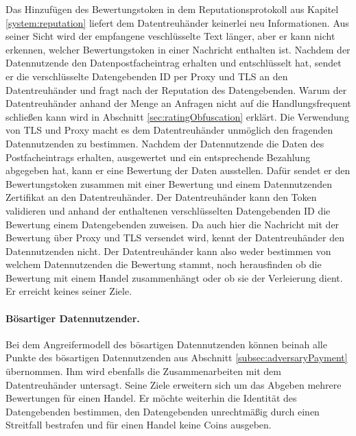 \documentclass[
	fontsize=12pt,
	headings=small,
	parskip=half,           %
	bibliography=totoc,
	numbers=noenddot,       %
	open=any,               %
]{scrreprt}
\begin{document}
Das Hinzufügen des Bewertungstoken in dem Reputationsprotokoll aus Kapitel \ref{system:reputation} liefert dem Datentreuhänder keinerlei neu Informationen. Aus seiner Sicht wird der empfangene veschlüsselte Text länger, aber er kann nicht erkennen, welcher Bewertungstoken in einer Nachricht enthalten ist. Nachdem der Datennutzende den Datenpostfacheintrag erhalten und entschlüsselt hat, sendet er die verschlüsselte Datengebenden ID per Proxy und TLS an den Datentreuhänder und fragt nach der Reputation des Datengebenden. Warum der Datentreuhänder anhand der Menge an Anfragen nicht auf die Handlungsfrequent schließen kann wird in Abschnitt \ref{sec:ratingObfuscation} erklärt. Die Verwendung von TLS und Proxy macht es dem Datentreuhänder unmöglich den fragenden Datennutzenden zu bestimmen. Nachdem der Datennutzende die Daten des Postfacheintrags erhalten, ausgewertet und ein entsprechende Bezahlung abgegeben hat, kann er eine Bewertung der Daten ausstellen. Dafür sendet er den Bewertungstoken zusammen mit einer Bewertung und einem Datennutzenden Zertifikat an den Datentreuhänder. Der Datentreuhänder kann den Token validieren und anhand der enthaltenen verschlüsselten Datengebenden ID die Bewertung einem Datengebenden zuweisen. Da auch hier die Nachricht mit der Bewertung über Proxy und TLS versendet wird, kennt der Datentreuhänder den Datennutzenden nicht. Der Datentreuhänder kann also weder bestimmen von welchem Datennutzenden die Bewertung stammt, noch herausfinden ob die Bewertung mit einem Handel zusammenhängt oder ob sie der Verleierung dient. Er erreicht keines seiner Ziele. 

\paragraph{Bösartiger Datennutzender.}
Bei dem Angreifermodell des bösartigen Datennutzenden können beinah alle Punkte des bösartigen Datennutzenden aus Abschnitt \ref{subsec:adversaryPayment} übernommen.
Ihm wird ebenfalls die Zusammenarbeiten mit dem Datentreuhänder untersagt. Seine Ziele erweitern sich um das Abgeben mehrere Bewertungen für einen Handel. Er möchte weiterhin die Identität des Datengebenden bestimmen, den Datengebenden unrechtmäßig durch einen Streitfall bestrafen und für einen Handel keine Coins ausgeben.
\end{document}

